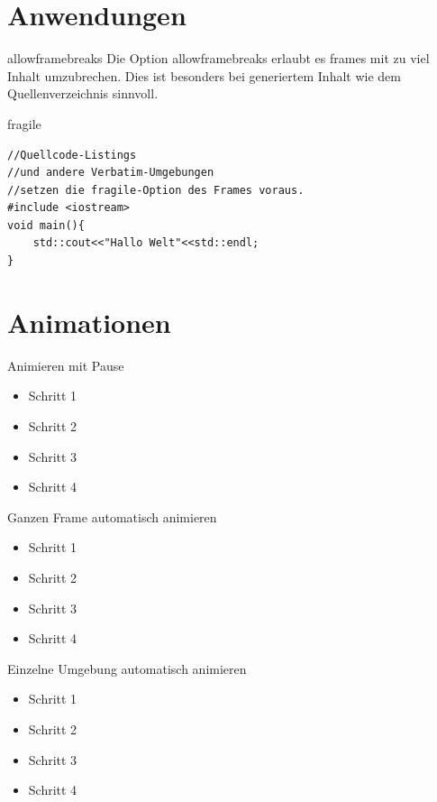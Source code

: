 \documentclass[t,aspectratio=169,dvipsnames]{beamer}
\begin{document}
\section{Anwendungen}



\begin{frame}[allowframebreaks]{allowframebreaks}
	Die Option allowframebreaks erlaubt es frames mit zu viel Inhalt umzubrechen. Dies ist besonders bei generiertem Inhalt wie dem Quellenverzeichnis sinnvoll.
	\\[1cm]
	\lipsum[1-2]
\end{frame}

\begin{frame}[fragile]{fragile}
\begin{lstlisting}
//Quellcode-Listings
//und andere Verbatim-Umgebungen
//setzen die fragile-Option des Frames voraus.
#include <iostream>
void main(){
	std::cout<<"Hallo Welt"<<std::endl;
}
\end{lstlisting}
\end{frame}

\section{Animationen}

\begin{frame}{Animieren mit Pause}
\begin{itemize}
	\item Schritt 1
	\item Schritt 2
	\pause
	\item Schritt 3
	\item Schritt 4
\end{itemize}
\end{frame}

\begin{frame}[<+->]{Ganzen Frame automatisch animieren}
\begin{itemize}
	\item Schritt 1
	\item Schritt 2
	\item Schritt 3
	\item Schritt 4
\end{itemize}
\end{frame}

\begin{frame}{Einzelne Umgebung automatisch animieren}
\begin{itemize}[<+->]
	\item Schritt 1
	\item Schritt 2
	\item Schritt 3
	\item Schritt 4
\end{itemize}
\end{frame}
\end{document}
